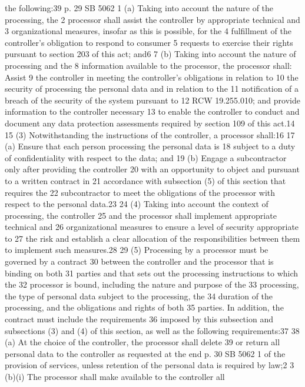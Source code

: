 the following:39
p. 29 SB 5062
1 (a) Taking into account the nature of the processing, the
2 processor shall assist the controller by appropriate technical and
3 organizational measures, insofar as this is possible, for the
4 fulfillment of the controller's obligation to respond to consumer
5 requests to exercise their rights pursuant to section 203 of this
act; and6
7 (b) Taking into account the nature of processing and the
8 information available to the processor, the processor shall: Assist
9 the controller in meeting the controller's obligations in relation to
10 the security of processing the personal data and in relation to the
11 notification of a breach of the security of the system pursuant to
12 RCW 19.255.010; and provide information to the controller necessary
13 to enable the controller to conduct and document any data protection
assessments required by section 109 of this act.14
15 (3) Notwithstanding the instructions of the controller, a
processor shall:16
17 (a) Ensure that each person processing the personal data is
18 subject to a duty of confidentiality with respect to the data; and
19 (b) Engage a subcontractor only after providing the controller
20 with an opportunity to object and pursuant to a written contract in
21 accordance with subsection (5) of this section that requires the
22 subcontractor to meet the obligations of the processor with respect
to the personal data.23
24 (4) Taking into account the context of processing, the controller
25 and the processor shall implement appropriate technical and
26 organizational measures to ensure a level of security appropriate to
27 the risk and establish a clear allocation of the responsibilities
between them to implement such measures.28
29 (5) Processing by a processor must be governed by a contract
30 between the controller and the processor that is binding on both
31 parties and that sets out the processing instructions to which the
32 processor is bound, including the nature and purpose of the
33 processing, the type of personal data subject to the processing, the
34 duration of the processing, and the obligations and rights of both
35 parties. In addition, the contract must include the requirements
36 imposed by this subsection and subsections (3) and (4) of this
section, as well as the following requirements:37
38 (a) At the choice of the controller, the processor shall delete
39 or return all personal data to the controller as requested at the end
p. 30 SB 5062
1 of the provision of services, unless retention of the personal data
is required by law;2
3 (b)(i) The processor shall make available to the controller all
